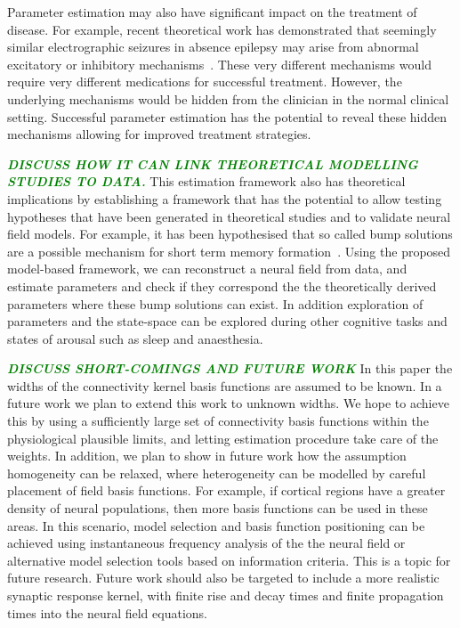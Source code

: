 \documentclass[12pt]{iopart}
\newcommand{\omg}[1]{\textsf{\emph{\textbf{\textcolor{green}{#1}}}}}
\begin{document}
Parameter estimation may also have significant impact on the treatment of disease. For example, recent theoretical work has demonstrated that seemingly similar electrographic seizures in absence epilepsy may arise from abnormal excitatory or inhibitory mechanisms~\cite{Marten2009}. These very different mechanisms would require very different medications for successful treatment. However, the underlying mechanisms would be hidden from the clinician in the normal clinical setting. Successful parameter estimation has the potential to reveal these hidden mechanisms allowing for improved treatment strategies.

\omg{DISCUSS HOW IT CAN LINK THEORETICAL MODELLING STUDIES TO DATA.}
This estimation framework also has theoretical implications by establishing a framework that has the potential to allow testing hypotheses that have been generated in theoretical studies and to validate neural field models. For example, it has been hypothesised that so called bump solutions are a possible mechanism for short term memory formation~\cite{Coombes2005}. Using the proposed model-based framework, we can reconstruct a neural field from data, and estimate parameters and check if they correspond the the theoretically derived parameters where these bump solutions can exist. In addition exploration of parameters and the state-space can be explored during other cognitive tasks and states of arousal such as sleep and anaesthesia. 

\omg{DISCUSS SHORT-COMINGS AND FUTURE WORK}
In this paper the widths of the connectivity kernel basis functions are assumed to be known. In a future work we plan to extend this work to unknown widths. We hope to achieve this by using a sufficiently large set of connectivity basis functions within the physiological plausible limits, and letting estimation procedure take care of the weights. In addition, we plan to show in future work how the assumption homogeneity can be relaxed, where heterogeneity can be modelled by careful placement of field basis functions. For example, if cortical regions have a greater density of neural populations, then more basis functions can be used in these areas. In this scenario, model selection and basis function positioning can be achieved using instantaneous frequency analysis of the the neural field or alternative model selection tools based on information criteria. This is a topic for future research. Future work should also be targeted to include a more realistic synaptic response kernel, with finite rise and decay times and finite propagation times into the neural field equations.
\end{document}
